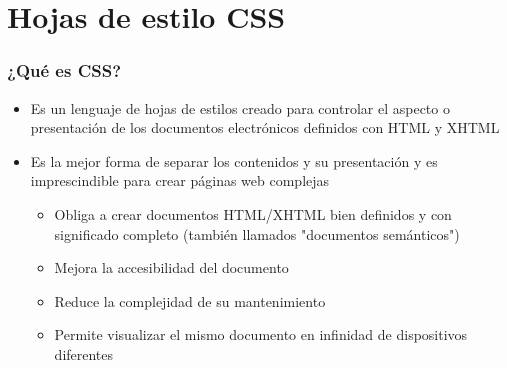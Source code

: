 %

\section{Hojas de estilo CSS}





\begin{frame}
\frametitle{¿Qué es CSS?}

\begin{itemize}
  \item Es un lenguaje de hojas de estilos creado para controlar el aspecto o presentación de los documentos electrónicos definidos con HTML y XHTML
  \item Es la mejor forma de separar los contenidos y su presentación y es imprescindible para crear páginas web complejas
  \begin{itemize}
    \item Obliga a crear documentos HTML/XHTML bien definidos y con significado completo (también llamados "documentos semánticos")
    \item Mejora la accesibilidad del documento
    \item Reduce la complejidad de su mantenimiento
    \item Permite visualizar el mismo documento en infinidad de dispositivos diferentes
  \end{itemize}
\end{itemize}

\end{frame}

